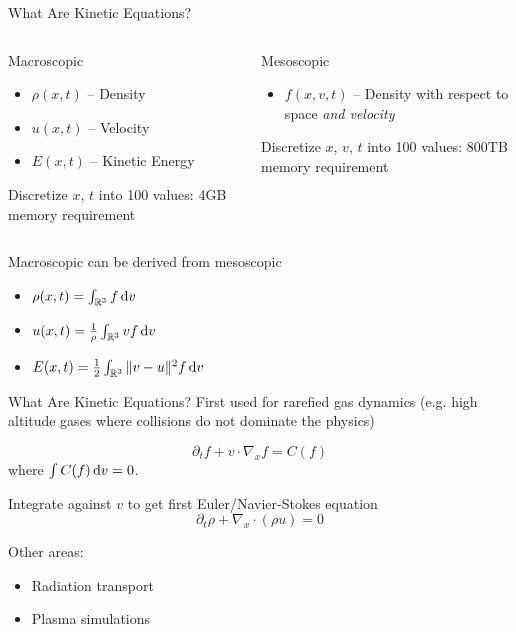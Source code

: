 \documentclass{beamer}
\renewcommand{\vec}[1]{\ensuremath{#1}}
\newcommand{\R}{\ensuremath{\mathbb{R}}\xspace}
\begin{document}
    \begin{frame}{What Are Kinetic Equations?}
        \begin{columns}[t]
            \begin{block}{Macroscopic}
                \begin{itemize}
                    \item $\rho(\vec{x},t)$ -- Density
                    \item $\vec{u}(\vec{x},t)$ -- Velocity
                    \item $E(\vec{x},t)$ -- Kinetic Energy
                \end{itemize}
                Discretize \vec{x}, $t$ into 100 values: 4GB memory requirement
            \end{block}
            \begin{block}{Mesoscopic}
                \begin{itemize}
                    \item $f(\vec{x},\vec{v},t)$ -- Density with respect to space \emph{and velocity}
                \end{itemize}
                Discretize \vec{x}, \vec{v}, $t$ into 100 values: 800TB memory requirement
            \end{block}
        \end{columns}

        \vfill

        Macroscopic can be derived from mesoscopic
        \begin{itemize}
            \item $\rho(\vec{x},t) = \int_{\R^3} f \dif \vec{v}$
            \item $\vec{u}(\vec{x},t) = \frac{1}{\rho} \int_{\R^3} \vec{v}f \dif \vec{v}$
            \item $E(\vec{x},t) = \frac{1}{2} \int_{\R^3} \| \vec{v} - \vec{u} \|^2 f \dif \vec{v}$
        \end{itemize}
    \end{frame}

    \begin{frame}{What Are Kinetic Equations?}
        First used for rarefied gas dynamics (e.g. high altitude gases where collisions do not dominate the physics)

        \[\partial_t f + \vec{v} \cdot \nabla_\vec{x} f = C(f)\]
        where $\int C(f) \dif \vec{v} = 0$.

        \vfill

        Integrate against \vec{v} to get first Euler/Navier-Stokes equation
        \[\partial_t \rho + \nabla_{\vec{x}} \cdot (\rho \vec{u}) = 0\]

        \vfill

        Other areas:
        \begin{itemize}
            \item Radiation transport
            \item Plasma simulations
        \end{itemize}
    \end{frame}
\end{document}
